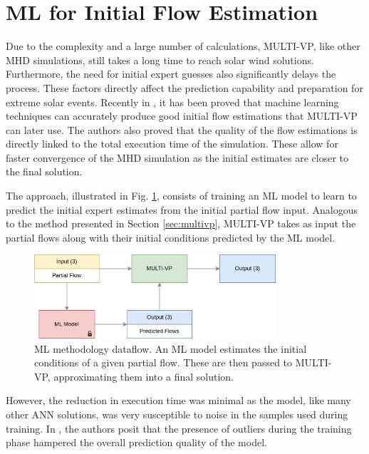 \section{ML for Initial Flow Estimation}\label{sec:ml_initial_flow}
Due to the complexity and a large number of calculations, MULTI-VP, like other MHD simulations, still takes a long time to reach solar wind solutions. Furthermore, the need for initial expert guesses also significantly delays the process. These factors directly affect the prediction capability and preparation for extreme solar events. Recently in \cite{barros_InitialConditionEstimation_}, it has been proved that machine learning techniques can accurately produce good initial flow estimations that MULTI-VP can later use. The authors also proved that the quality of the flow estimations is directly linked to the total execution time of the simulation. These allow for faster convergence of the MHD simulation as the initial estimates are closer to the final solution. 

The approach, illustrated in Fig. \ref{fig:multivp_rnn}, consists of training an ML model to learn to predict the initial expert estimates from the initial partial flow input. Analogous to the method presented in Section \ref{sec:multivp}, MULTI-VP takes as input the partial flows along with their initial conditions predicted by the ML model.

\begin{figure}[ht]
\centering
\includegraphics[width=0.8\textwidth]{figures/multivp_rnn.png}
\caption[ML methodology dataflow]{ML methodology dataflow. An ML model estimates the initial conditions of a given partial flow. These are then passed to MULTI-VP, approximating them into a final solution. \label{fig:multivp_rnn}}
\end{figure}

However, the reduction in execution time was minimal as the model, like many other ANN solutions, was very susceptible to noise in the samples used during training. In \cite{barros_InitialConditionEstimation_}, the authors posit that the presence of outliers during the training phase hampered the overall prediction quality of the model.



